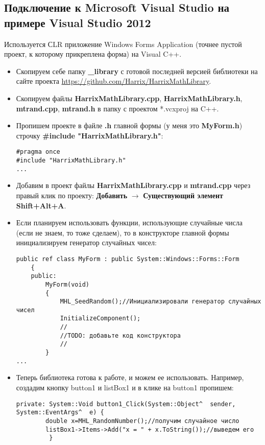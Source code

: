 \documentclass[a4paper,12pt]{article}
\begin{document}
\subsection{Подключение к Microsoft Visual Studio на примере Visual Studio 2012}

Используется СLR приложение Windows Forms Application (точнее пустой проект, к которому прикреплена форма) на Visual C++.

\begin{itemize}
\item Скопируем себе папку \textbf{\_library} с готовой последней версией библиотеки на сайте проекта \href{https://github.com/Harrix/HarrixMathLibrary}{https://github.com/Harrix/HarrixMathLibrary}.

\item Скопируем файлы \textbf{HarrixMathLibrary.cpp}, \textbf{HarrixMathLibrary.h}, \textbf{mtrand.cpp}, \textbf{mtrand.h} в папку с проектом *.vcxproj на C++.

\item Пропишем проекте в файле \textbf{.h} главной формы (у меня это \textbf{MyForm.h}) строчку \textbf{\#include "HarrixMathLibrary.h"}:
\begin{lstlisting}[label=install_code_07,caption=Подключение библиотеки]
#pragma once
#include "HarrixMathLibrary.h"
...
\end{lstlisting}

\item Добавим в проект файлы \textbf{HarrixMathLibrary.cpp} и \textbf{mtrand.cpp} через правый клик по проекту: \textbf{Добавить} $\rightarrow$ \textbf{Существующий элемент Shift+Alt+A}.

\item Если планируем использовать функции, использующие случайные числа (если не знаем, то тоже сделаем), то в конструкторе главной формы инициализируем генератор случайных чисел:
\begin{lstlisting}[label=install_code_08,caption=Инициализация генератора случайных чисел]
	public ref class MyForm : public System::Windows::Forms::Form
	{
	public:
		MyForm(void)
		{
			MHL_SeedRandom();//Инициализировали генератор случайных чисел
			InitializeComponent();
			//
			//TODO: добавьте код конструктора
			//
		}
...
\end{lstlisting}

\item Теперь библиотека готова к работе, и можем ее использовать. Например, создадим кнопку button1 и listBox1 и в клике на button1 пропишем:
\begin{lstlisting}[label=install_code_09,caption=Пример использования]
private: System::Void button1_Click(System::Object^  sender, System::EventArgs^  e) {
 		double x=MHL_RandomNumber();//получим случайное число
 		listBox1->Items->Add("x = " + x.ToString());//выведем его
 		 }
\end{lstlisting}
\end{itemize}
\end{document}

